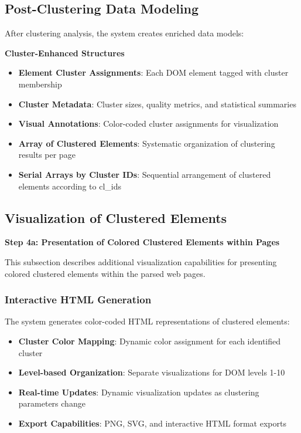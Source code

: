 \subsection{Post-Clustering Data Modeling}
\label{subsec:post-clustering-modeling}

After clustering analysis, the system creates enriched data models:

\textbf{Cluster-Enhanced Structures}
\begin{itemize}
    \item \textbf{Element Cluster Assignments}: Each DOM element tagged with cluster membership
    \item \textbf{Cluster Metadata}: Cluster sizes, quality metrics, and statistical summaries
    \item \textbf{Visual Annotations}: Color-coded cluster assignments for visualization
    \item \textbf{Array of Clustered Elements}: Systematic organization of clustering results per page
    \item \textbf{Serial Arrays by Cluster IDs}: Sequential arrangement of clustered elements according to cl\_ids
\end{itemize}

\subsection{Visualization of Clustered Elements}
\label{subsec:more-visualization}

\textbf{Step 4a: Presentation of Colored Clustered Elements within Pages}

This subsection describes additional visualization capabilities for presenting colored clustered elements within the parsed web pages.

\subsubsection{Interactive HTML Generation}
The system generates color-coded HTML representations of clustered elements:

\begin{itemize}
    \item \textbf{Cluster Color Mapping}: Dynamic color assignment for each identified cluster
    \item \textbf{Level-based Organization}: Separate visualizations for DOM levels 1-10
    \item \textbf{Real-time Updates}: Dynamic visualization updates as clustering parameters change
    \item \textbf{Export Capabilities}: PNG, SVG, and interactive HTML format exports
\end{itemize}

